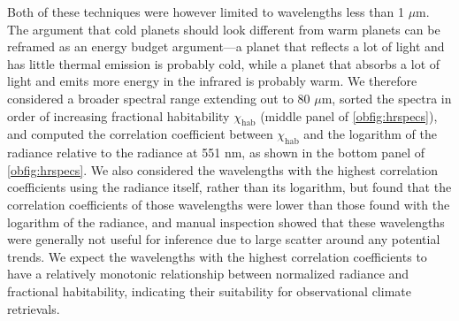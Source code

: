 \documentclass[fleqn,usenatbib]{mnras}
\begin{document}
Both of these techniques \citep{Cowan2011,Krissansen-Totton2016} were however limited to wavelengths less than 1 $\mu$m. The argument that cold planets should look different from warm planets can be reframed as an energy budget argument---a planet that reflects a lot of light and has little thermal emission is probably cold, while a planet that absorbs a lot of light and emits more energy in the infrared is probably warm. We therefore considered a broader spectral range extending out to 80 $\mu$m, sorted the spectra in order of increasing fractional habitability $\chi_\text{hab}$ (middle panel of \autoref{obfig:hrspecs}), and computed the correlation coefficient between $\chi_\text{hab}$ and the logarithm of the radiance relative to the radiance at 551 nm, as shown in the bottom panel of \autoref{obfig:hrspecs}. We also considered the wavelengths with the highest correlation coefficients using the radiance itself, rather than its logarithm, but found that the correlation coefficients of those wavelengths were lower than those found with the logarithm of the radiance, and manual inspection showed that these wavelengths were generally not useful for inference due to large scatter around any potential trends. We expect the wavelengths with the highest correlation coefficients to have a relatively monotonic relationship between normalized radiance and fractional habitability, indicating their suitability for observational climate retrievals.
\end{document}
